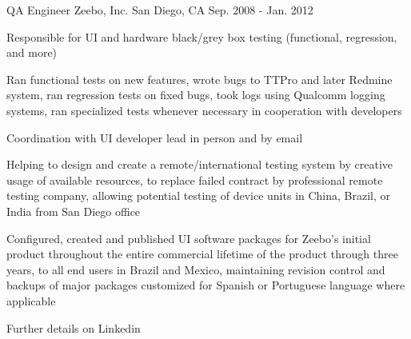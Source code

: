 \begin{cventries}
\cventry
{QA Engineer} %
{Zeebo, Inc.} %
{San Diego, CA} %
{Sep. 2008 - Jan. 2012} %
{
\begin{cvitems}
\item[] {Responsible for UI and hardware black/grey box testing (functional, regression, and more)}
\item[]
\item {Ran functional tests on new features, wrote bugs to TTPro and later Redmine system, ran regression tests on fixed bugs, took logs using Qualcomm logging systems, ran specialized tests whenever necessary in cooperation with developers}
\item {Coordination with UI developer lead in person and by email}
\item {Helping to design and create a remote/international testing system by creative usage of available resources, to replace failed contract by professional remote testing company, allowing potential testing of device units in China, Brazil, or India from San Diego office}
\item {Configured, created and published UI software packages for Zeebo's initial product throughout the entire commercial lifetime of the product through three years, to all end users in Brazil and Mexico, maintaining revision control and backups of major packages customized for Spanish or Portuguese language where applicable}
\end{cvitems}
}

\cventry
{} %
{Further details on Linkedin} %
{} %
{} %
{
\begin{cvitems}
\item[] {}
\item[]
\end{cvitems}
}

\end{cventries}
